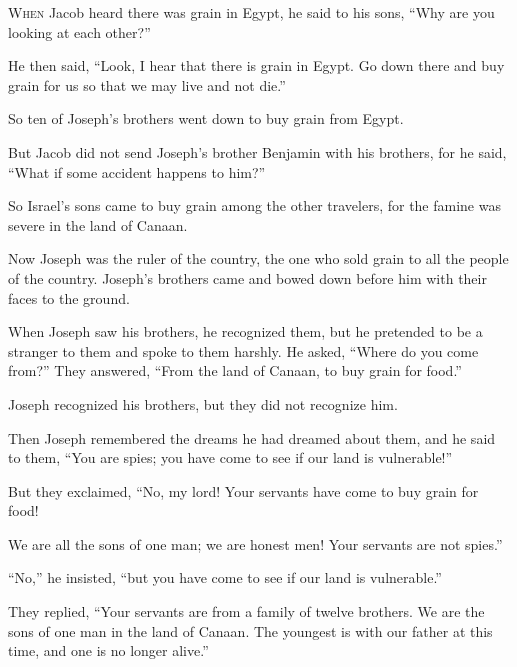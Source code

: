 \begin{scripture}
 \allowchapbreak\hypertarget{ch-genesis-42}{}\lettrine[lines=5]{\color{pentateuch}W}{\textsc{hen}} Jacob heard there was grain in Egypt, he said to his sons, ``Why are you looking at each other?''\everypar{}
 He then said, ``Look, I hear that there is grain in Egypt. Go down there and buy grain for us so that we may live and not die.''
\\\indent{} So ten of Joseph's brothers went down to buy grain from Egypt.
 But Jacob did not send Joseph's brother Benjamin with his brothers, for he said, ``What if some accident happens to him?''
 So Israel's sons came to buy grain among the other travelers, for the famine was severe in the land of Canaan.
\everypar{}

 Now Joseph was the ruler of the country, the one who sold grain to all the people of the country. Joseph's brothers came and bowed down before him with their faces to the ground.
 When Joseph saw his brothers, he recognized them, but he pretended to be a stranger to them and spoke to them harshly. He asked, ``Where do you come from?'' They answered, ``From the land of Canaan, to buy grain for food.''
\everypar{}

 Joseph recognized his brothers, but they did not recognize him.
 Then Joseph remembered the dreams he had dreamed about them, and he said to them, ``You are spies; you have come to see if our land is vulnerable!''
\everypar{}

 But they exclaimed, ``No, my lord! Your servants have come to buy grain for food!
 We are all the sons of one man; we are honest men! Your servants are not spies.''
\everypar{}

 ``No,'' he insisted, ``but you have come to see if our land is vulnerable.''
 They replied, ``Your servants are from a family of twelve brothers. We are the sons of one man in the land of Canaan. The youngest is with our father at this time, and one is no longer alive.''
\everypar{}


\end{scripture}
